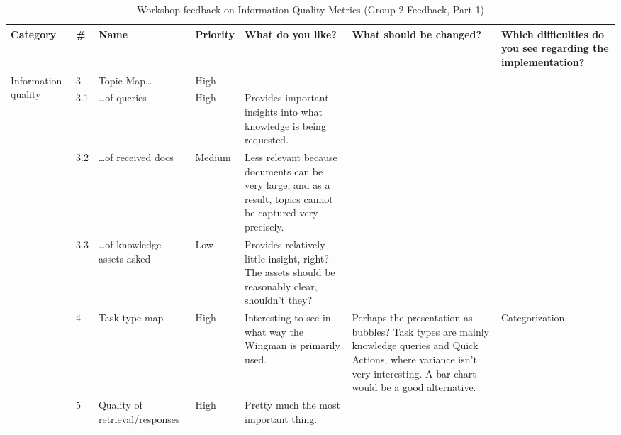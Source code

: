 \documentclass[
	english,
	ruledheaders=section,%
	class=report,%
	thesis={type=bachelor},%
	accentcolor=1b,%
	custommargins=true,%
	marginpar=false,%
	parskip=half-,%
	fontsize=11pt,%
	DIV=14,
]{tudapub}
\begin{document}
\begin{table}
    \centering
    \small 
    \caption{Workshop feedback on Information Quality Metrics (Group 2 Feedback, Part 1)}
    \label{tab:info_quality_g2_p1}
    \begin{tabularx}{\textheight}{p{2.2cm} l >{\RaggedRight\arraybackslash}X l >{\RaggedRight\arraybackslash}X >{\RaggedRight\arraybackslash}X >{\RaggedRight\arraybackslash}X}
        \toprule
        \textbf{Category} & \textbf{\#} & \textbf{Name} & \textbf{Priority} & \textbf{What do you like?} & \textbf{What should be changed?} & \textbf{Which difficulties do you see regarding the implementation?} \\
        \midrule

        \multirow{6}{=}{Information quality} 
        & 3 & Topic Map\dots & High & & & \\
        \cmidrule(l){2-7}
        & 3.1 & \dots of queries & High & Provides important insights into what knowledge is being requested. & & \\
        \cmidrule(l){2-7}
        & 3.2 & \dots of received docs & Medium & Less relevant because documents can be very large, and as a result, topics cannot be captured very precisely. & & \\
        \cmidrule(l){2-7}
        & 3.3 & \dots of knowledge assets asked & Low & Provides relatively little insight, right? The assets should be reasonably clear, shouldn't they? & & \\
        \cmidrule(l){2-7}
        & 4 & Task type map & High & Interesting to see in what way the Wingman is primarily used. & Perhaps the presentation as bubbles? Task types are mainly knowledge queries and Quick Actions, where variance isn't very interesting. A bar chart would be a good alternative. & Categorization. \\
        \cmidrule(l){2-7}
        & 5 & Quality of retrieval/responses & High & Pretty much the most important thing. & & \\
        \bottomrule
    \end{tabularx}
\end{table}
\end{document}
